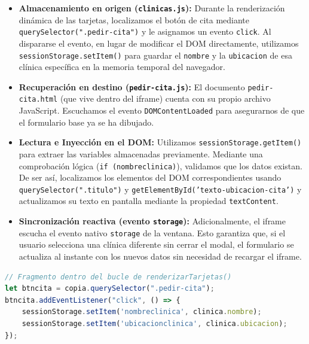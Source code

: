 \documentclass[11pt]{article}
\begin{document}
\begin{itemize}
\item \textbf{Almacenamiento en origen (\texttt{clinicas.js}):} Durante la renderización dinámica de las tarjetas, localizamos el botón de cita mediante \texttt{querySelector(".pedir-cita")} y le asignamos un evento \texttt{click}. Al dispararse el evento, en lugar de modificar el DOM directamente, utilizamos \texttt{sessionStorage.setItem()} para guardar el \texttt{nombre} y la \texttt{ubicacion} de esa clínica específica en la memoria temporal del navegador.
\item \textbf{Recuperación en destino (\texttt{pedir-cita.js}):} El documento \texttt{pedir-cita.html} (que vive dentro del iframe) cuenta con su propio archivo JavaScript. Escuchamos el evento \texttt{DOMContentLoaded} para asegurarnos de que el formulario base ya se ha dibujado.
\item \textbf{Lectura e Inyección en el DOM:} Utilizamos \texttt{sessionStorage.getItem()} para extraer las variables almacenadas previamente. Mediante una comprobación lógica (\texttt{if (nombreclinica)}), validamos que los datos existan. De ser así, localizamos los elementos del DOM correspondientes usando \texttt{querySelector(".titulo")} y \texttt{getElementById('texto-ubicacion-cita')} y actualizamos su texto en pantalla mediante la propiedad \texttt{textContent}.
\item \textbf{Sincronización reactiva (evento \texttt{storage}):} Adicionalmente, el iframe escucha el evento nativo \texttt{storage} de la ventana. Esto garantiza que, si el usuario selecciona una clínica diferente sin cerrar el modal, el formulario se actualiza al instante con los nuevos datos sin necesidad de recargar el iframe.
\end{itemize}

\begin{lstlisting}[language=JavaScript, caption=Guardado de estado en la generación de la tarjeta (clinicas.js)]
// Fragmento dentro del bucle de renderizarTarjetas()
let btncita = copia.querySelector(".pedir-cita");
btncita.addEventListener("click", () => {
	sessionStorage.setItem('nombreclinica', clinica.nombre);
	sessionStorage.setItem('ubicacionclinica', clinica.ubicacion);
});
\end{lstlisting}
\end{document}
